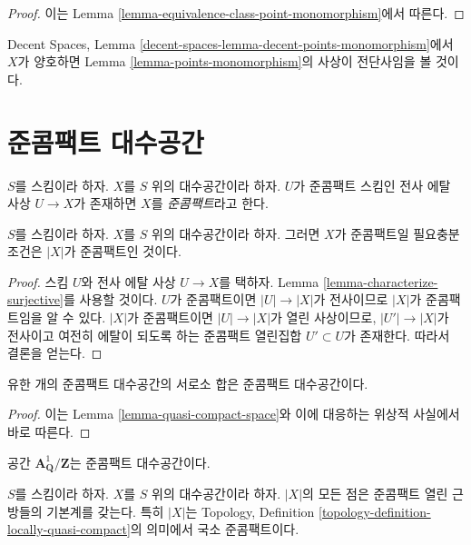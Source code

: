 \begin{proof}
이는 Lemma \ref{lemma-equivalence-class-point-monomorphism}에서 따른다.
\end{proof}

\noindent
Decent Spaces, Lemma
\ref{decent-spaces-lemma-decent-points-monomorphism}에서
$X$가 양호하면 Lemma \ref{lemma-points-monomorphism}의
사상이 전단사임을 볼 것이다.

\section{준콤팩트 대수공간}
\label{section-quasi-compact}

\begin{definition}
\label{definition-quasi-compact}
$S$를 스킴이라 하자.
$X$를 $S$ 위의 대수공간이라 하자.
$U$가 준콤팩트 스킴인 전사 에탈 사상 $U \to X$가 존재하면
$X$를 {\it 준콤팩트}라고 한다.
\end{definition}

\begin{lemma}
\label{lemma-quasi-compact-space}
$S$를 스킴이라 하자.
$X$를 $S$ 위의 대수공간이라 하자.
그러면 $X$가 준콤팩트일 필요충분조건은 $|X|$가 준콤팩트인 것이다.
\end{lemma}

\begin{proof}
스킴 $U$와 전사 에탈 사상 $U \to X$를 택하자.
Lemma \ref{lemma-characterize-surjective}를 사용할 것이다.
$U$가 준콤팩트이면 $|U| \to |X|$가 전사이므로
$|X|$가 준콤팩트임을 알 수 있다.
$|X|$가 준콤팩트이면 $|U| \to |X|$가 열린 사상이므로,
$|U'| \to |X|$가 전사이고 여전히 에탈이 되도록 하는
준콤팩트 열린집합 $U' \subset U$가 존재한다.
따라서 결론을 얻는다.
\end{proof}


\begin{lemma}
\label{lemma-finite-disjoint-quasi-compact}
유한 개의 준콤팩트 대수공간의 서로소 합은 준콤팩트 대수공간이다.
\end{lemma}

\begin{proof}
이는 Lemma \ref{lemma-quasi-compact-space}와 이에 대응하는
위상적 사실에서 바로 따른다.
\end{proof}

\begin{example}
\label{example-quasi-compact-not-very-reasonable}
공간 $\mathbf{A}^1_{\mathbf{Q}}/\mathbf{Z}$는 준콤팩트 대수공간이다.
\end{example}

\begin{lemma}
\label{lemma-space-locally-quasi-compact}
$S$를 스킴이라 하자.
$X$를 $S$ 위의 대수공간이라 하자.
$|X|$의 모든 점은 준콤팩트 열린 근방들의 기본계를 갖는다.
특히 $|X|$는 Topology, Definition
\ref{topology-definition-locally-quasi-compact}의 의미에서 국소 준콤팩트이다.
\end{lemma}

